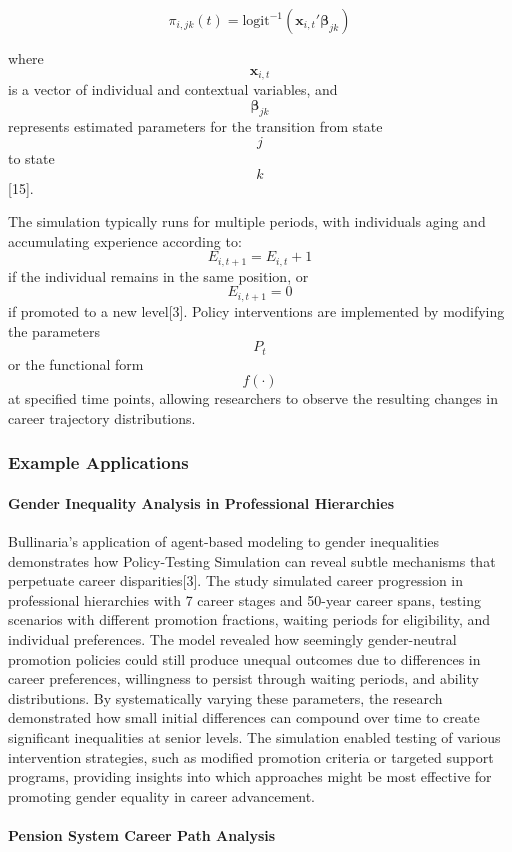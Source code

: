 \documentclass[main.tex]{subfiles}
\begin{document}
$$\pi_{i,jk}(t) = \text{logit}^{-1}(\mathbf{x}_{i,t}'\boldsymbol{\beta}_{jk})$$

where $$\mathbf{x}_{i,t}$$ is a vector of individual and contextual variables, and $$\boldsymbol{\beta}_{jk}$$ represents estimated parameters for the transition from state $$j$$ to state $$k$$[15].

The simulation typically runs for multiple periods, with individuals aging and accumulating experience according to: $$E_{i,t+1} = E_{i,t} + 1$$ if the individual remains in the same position, or $$E_{i,t+1} = 0$$ if promoted to a new level[3]. Policy interventions are implemented by modifying the parameters $$P_t$$ or the functional form $$f(\cdot)$$ at specified time points, allowing researchers to observe the resulting changes in career trajectory distributions.

\subsubsection{Example Applications}

\paragraph{Gender Inequality Analysis in Professional Hierarchies}

Bullinaria's application of agent-based modeling to gender inequalities demonstrates how Policy-Testing Simulation can reveal subtle mechanisms that perpetuate career disparities[3]. The study simulated career progression in professional hierarchies with 7 career stages and 50-year career spans, testing scenarios with different promotion fractions, waiting periods for eligibility, and individual preferences. The model revealed how seemingly gender-neutral promotion policies could still produce unequal outcomes due to differences in career preferences, willingness to persist through waiting periods, and ability distributions. By systematically varying these parameters, the research demonstrated how small initial differences can compound over time to create significant inequalities at senior levels. The simulation enabled testing of various intervention strategies, such as modified promotion criteria or targeted support programs, providing insights into which approaches might be most effective for promoting gender equality in career advancement.

\paragraph{Pension System Career Path Analysis}
\end{document}
